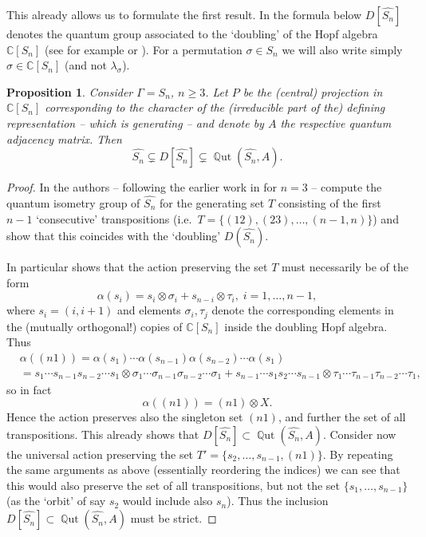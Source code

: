 \documentclass[12pt]{amsart}
\newtheorem{prop}[thm]{Proposition}
\theoremstyle{definition}
\theoremstyle{definition}
\theoremstyle{definition}
\theoremstyle{definition}
\DeclareMathOperator{\Qut}{\mathbb{Q}ut}
\newcommand{\C}{\mathbb{C}}
\numberwithin{equation}{section}
\begin{document}
This already allows us to formulate the first result. In the formula below $D[ \widehat{S_n}]$ denotes the quantum group associated to the `doubling' of the Hopf algebra $\C[S_n]$ (see for example \cite{LDS12} or \cite{SkS14}). For a permutation $\sigma \in S_n$ we will also write simply $\sigma \in \mathbb{C}[S_n]$ (and not $\lambda_\sigma$).

\begin{prop} \label{prop:Sndifferent}
Consider $\Gamma=S_n$, $n\geq 3$. Let $P$ be the (central) projection in $\C[S_n]$ corresponding to the character of the (irreducible part of the) defining representation -- which is generating -- and denote by $A$ the respective quantum adjacency matrix. %
Then 
\[ \widehat{S_n}  \subsetneq D[ \widehat{S_n}] \subsetneq \Qut(\widehat{S_n}, A).  \]
\end{prop}

\begin{proof}
In \cite{LDS12} the authors -- following the earlier work in \cite{BhS10} for $n=3$ -- compute the quantum isometry group of $\widehat{S_n}$ for the generating set $T$ consisting of the first $n-1$ `consecutive' transpositions (i.e.\ $T=\{(12), (23),\ldots, (n-1, n)\}$) and show that this coincides with the `doubling' $D(\widehat{S_n})$. 

In particular  \cite[Formula (2.33)]{LDS12}  shows that the action   preserving the set $T$ must necessarily be of the form 
\begin{equation} \label{Doublingaction} \alpha(s_i) = s_i \otimes \sigma_i   + s_{n-i}  \otimes \tau_i , \; i=1,\ldots, n-1,\end{equation}
where $s_i=(i,i+1)$ and elements $\sigma_i, \tau_j$ denote the corresponding elements in the (mutually orthogonal!) copies of $\C[S_n]$ inside the doubling Hopf algebra. Thus 
\begin{align*}&\alpha((n1)) = \alpha(s_1) \cdots \alpha(s_{n-1}) \alpha(s_{n-2}) \cdots \alpha (s_1) \\&= 
s_1 \cdots s_{n-1} s_{n-2} \cdots s_1 \otimes  \sigma_1 \cdots \sigma_{n-1} \sigma_{n-2} \cdots \sigma_1 + 
s_{n-1} \cdots s_{1} s_{2} \cdots s_{n-1}  \otimes 
\tau_1 \cdots \tau_{n-1} \tau_{n-2} \cdots \tau_1,
\end{align*}
so in fact
\[\alpha((n1)) = (n1)  \otimes X.\]
Hence the action preserves also the singleton set $(n1)$, and further the set of all transpositions. This already shows that 
$D[ \widehat{S_n}] \subset \Qut(\widehat{S_n}, A)$. Consider now the universal action preserving the set $T'=\{s_2,\ldots, s_{n-1}, (n1)\}$. By repeating the same arguments as above (essentially reordering the indices) we can see that this would also preserve the set of all transpositions, but not the set $\{s_1, \ldots, s_{n-1}\}$ (as the `orbit' of say $s_2$ would include also $s_n$). Thus the inclusion $D[ \widehat{S_n}] \subset \Qut(\widehat{S_n}, A)$ must be strict.
\end{proof}
\end{document}
